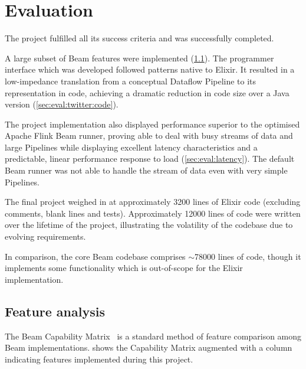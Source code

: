 \chapter{Evaluation}\label{ch:eval}
\label{sec:eval:overall}

The project fulfilled all its success criteria and was successfully completed.

A large subset of Beam features were implemented (\cref{sec:eval:limitations}).
The programmer interface which was developed followed patterns native to Elixir.
It resulted in a low-impedance translation from a conceptual Dataflow Pipeline to its representation in code, achieving a dramatic reduction in code size over a Java version (\cref{sec:eval:twitter:code}).

The project implementation also displayed performance superior to the optimised Apache Flink Beam runner, proving able to deal with busy streams of data and large Pipelines while displaying excellent latency characteristics and a predictable, linear performance response to load (\cref{sec:eval:latency}).
The default Beam runner was not able to handle the stream of data even with very simple Pipelines.

The final project weighed in at approximately \num{3200} lines of Elixir code (excluding comments, blank lines and tests).
Approximately \num{12000} lines of code were written over the lifetime of the project, illustrating the volatility of the codebase due to evolving requirements.

In comparison, the core Beam codebase comprises $\sim$\num{78000} lines of code, though it implements some functionality which is out-of-scope for the Elixir implementation.

\section{Feature analysis}\label{sec:eval:limitations}

The Beam Capability Matrix~\cite{Beam-Cap-Matrix} is a standard method of feature comparison among Beam implementations.
 shows the Capability Matrix augmented with a column indicating features implemented during this project.

